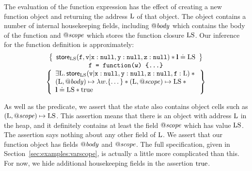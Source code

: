 \documentclass{article}
\begin{document}
The evaluation of the function
expression  has the effect of creating a new
function object and returning the address ${\mathrm{L}}$ of that
object. The object contains a number of internal housekeeping fields, including  $\mathit{@body}$
which contains the body of the function and $\mathit{@scope}$ which stores the
function closure ${\mathrm{LS}}$. Our  inference for the function definition  is approximately:
        \[\begin{array}{c}
                \left\{\begin{array}{l}
                        \mathsf{store}_{{\mathrm{LS}}}(\mbox{\texttt{{\upshape f}}},\mbox{\texttt{{\upshape v}}}|\mbox{\texttt{{\upshape x}}}:\mbox{\texttt{{\upshape null}}},\mbox{\texttt{{\upshape y}}}:\mbox{\texttt{{\upshape null}}},\mbox{\texttt{{\upshape z}}}:\mbox{\texttt{{\upshape null}}}) \mathbin{*}\textbf{l}\doteq{\ensuremath{\mathrm{LS}}}
                \end{array}\right\}\\
                \mbox{\texttt{{\upshape f = function(w) \{\dots\}}}}\\
                \left\{\begin{array}{l}
                        \exists{\ensuremath{\mathrm{L}}}\mathpunct{.}
                        \mathsf{store}_{{\mathrm{LS}}}(\mbox{\texttt{{\upshape v}}}|\mbox{\texttt{{\upshape x}}}:\mbox{\texttt{{\upshape null}}},\mbox{\texttt{{\upshape y}}}:\mbox{\texttt{{\upshape null}}},\mbox{\texttt{{\upshape z}}}:\mbox{\texttt{{\upshape null}}},\mbox{\texttt{{\upshape f}}}:{\mathrm{L}}) \mathbin{*} {}\\
                        ({\mathrm{L}},\mathit{@body})\mapsto \lambda w . \{\dots\}
                        \mathbin{*} ({\mathrm{L}},\mathit{@scope})\mapsto{\ensuremath{\mathrm{LS}}}\mathbin{*}{}\\
                        \textbf{l}\doteq{\ensuremath{\mathrm{LS}}}\mathbin{*}{\mathrm{true}}
                \end{array}\right\} \\
        \end{array}\]

As well as the \store predicate, we  assert that the state also contains
object cells such as $({\mathrm{L}},\mathit{@scope})\mapsto{\ensuremath{\mathrm{LS}}}$. This assertion means that
there is an object with address ${\mathrm{L}}$ in the heap, and it definitely contains
at least the field $\mathit{@scope}$ which has value ${\mathrm{LS}}$. The assertion says nothing
about any other field of ${\mathrm{L}}$.  We assert that our function object has
fields $\mathit{@body}$ and $\mathit{@scope}$. The full specification, given in
Section~\ref{sec:examples:varscope},  is actually a little more complicated than
this.  For now, we hide additional housekeeping  fields in the assertion ${\mathrm{true}}$.
\end{document}
